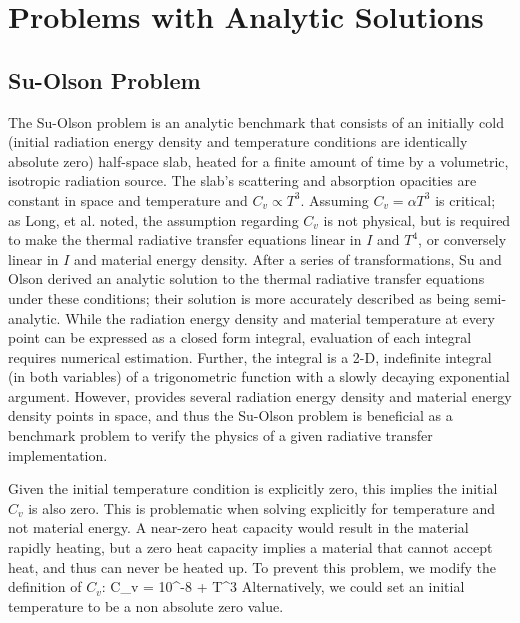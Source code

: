 \section{Problems with Analytic Solutions}
\label{sec:chap6_analytic_results}

\subsection{Su-Olson Problem}

The Su-Olson problem \cite{su_olson_1} is an analytic benchmark that consists of an initially cold (initial radiation energy density and temperature conditions are identically absolute zero) half-space slab, heated for a finite amount of time by a volumetric, isotropic radiation source.
The slab's scattering and absorption opacities are constant in space and temperature and $C_v \propto T^3$.
Assuming $C_v = \alpha T^3$ is critical; as Long, et al. \cite{alex_paper} noted, the assumption regarding $C_v$ is not physical, but is required to make the thermal radiative transfer equations linear in $I$ and $T^4$, or conversely linear in $I$ and material energy density. 
After a series of transformations, Su and Olson derived an analytic solution to the thermal radiative transfer equations under these conditions; their solution is more accurately described as being semi-analytic.
While the radiation energy density and material temperature at every point can be expressed as a closed form integral, evaluation of each integral requires numerical estimation.
Further, the integral is a 2-D, indefinite integral (in both variables) of a trigonometric function with a slowly  decaying exponential argument.
However, \cite{su_olson_1} provides several radiation energy density and material energy density points in space, and thus the Su-Olson problem is beneficial as a benchmark problem to verify the physics of a given radiative transfer implementation.

Given the initial temperature condition is explicitly zero, this implies the initial $C_v$ is also zero.
This is problematic when solving explicitly for temperature and not material energy.
A near-zero heat capacity would result in the material rapidly heating, but a zero heat capacity implies a material that cannot accept heat, and thus can never be heated up.
To prevent this problem, we modify the definition of $C_v$:
\benum
C_v = 10^{-8} + \alpha T^3 \pep
\eenum
Alternatively, we could set an initial temperature to be a non absolute zero value.

